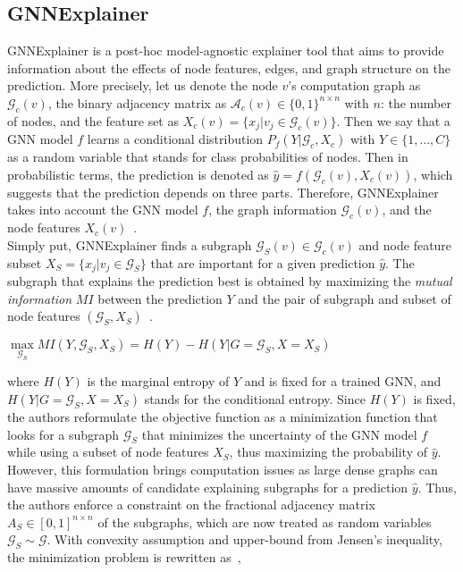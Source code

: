 \subsection{GNNExplainer}
\label{subsec:ExplainingGNNs_GNNExplainer}
GNNExplainer is a post-hoc model-agnostic explainer tool that aims to provide information about the effects of node features, edges, and graph structure on the prediction. More precisely, let us denote the node $v$'s computation graph as $\mathcal{G}_c(v)$, the binary adjacency matrix as $\mathcal{A}_c(v) \in \{0, 1\}^{n \times n}$ with $n$: the number of nodes, and the feature set as $X_c(v) = \{x_j|v_j \in \mathcal{G}_c(v)\}$. Then we say that a GNN model $f$ learns a conditional distribution $P_f(Y | \mathcal{G}_c, X_c)$ with $Y \in \{1, \dots, C\}$ as a random variable that stands for class probabilities of nodes. Then in probabilistic terms, the prediction is denoted as $\hat{y} = f(\mathcal{G}_c(v), X_c(v))$, which suggests that the prediction depends on three parts. Therefore, GNNExplainer takes into account the GNN model $f$, the graph information $\mathcal{G}_c(v)$, and the node features $X_c(v)$~\parencite{GNNExplainer_Ying}.\\
Simply put, GNNExplainer finds a subgraph $\mathcal{G}_S(v) \in \mathcal{G}_c(v)$ and node feature subset $X_S = \{x_j | v_j \in \mathcal{G}_S\}$ that are important for a given prediction $\hat{y}$. The subgraph that explains the prediction best is obtained by maximizing the \emph{mutual information} $MI$ between the prediction $Y$ and the pair of subgraph and subset of node features $(\mathcal{G}_S, X_S)$~\parencite{GNNExplainer_Ying}.
\begin{center}
    $\max\limits_{\mathcal{G}_S} MI(Y, \mathcal{G}_S, X_S) = H(Y) - H(Y|G=\mathcal{G}_S, X=X_S)$
\end{center}
where $H(Y)$ is the marginal entropy of $Y$ and is fixed for a trained GNN, and $H(Y|G=\mathcal{G}_S, X=X_S)$ stands for the conditional entropy. Since $H(Y)$ is fixed, the authors reformulate the objective function as a minimization function that looks for a subgraph $\mathcal{G}_S$ that minimizes the uncertainty of the GNN model $f$ while using a subset of node features $X_S$, thus maximizing the probability of $\hat{y}$. However, this formulation brings computation issues as large dense graphs can have massive amounts of candidate explaining subgraphs for a prediction $\hat{y}$. Thus, the authors enforce a constraint on the fractional adjacency matrix $A_S \in [0, 1]^{n \times n}$ of the subgraphs, which are now treated as random variables $\mathcal{G}_S \sim \mathcal{G}$. With convexity assumption and upper-bound from Jensen's inequality, the minimization problem is rewritten as~\parencite{GNNExplainer_Ying},
